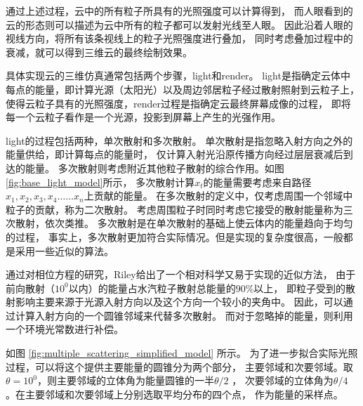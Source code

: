 通过上述过程，云中的所有粒子所具有的光照强度可以计算得到，
而人眼看到的云的形态则可以描述为云中所有的粒子都可以发射光线至人眼。
因此沿着人眼的视线方向，将所有该条视线上的粒子光照强度进行叠加，
同时考虑叠加过程中的衰减，就可以得到三维云的最终绘制效果。

具体实现云的三维仿真通常包括两个步骤，light和render。
light是指确定云体中每点的能量，即计算光源（太阳光）以及周边邻居粒子经过散射照射到云粒子上，
使得云粒子具有的光照强度，render过程是指确定云最终屏幕成像的过程，
即将每一个云粒子看作是一个光源，投影到屏幕上产生的光强作用。

light的过程包括两种，单次散射和多次散射。
单次散射是指忽略入射方向之外的能量供给，即计算每点的能量时，
仅计算入射光沿原传播方向经过层层衰减后到达的能量。
多次散射则考虑附近其他粒子散射的综合作用。如图\ref{fig:base_light_model}所示，
多次散射计算$x_t$的能量需要考虑来自路径$x_1,x_2,x_3,x_4\dots{}\dots{}x_n$上贡献的能量。
在多次散射的定义中，仅考虑周围一个邻域中粒子的贡献，称为二次散射。
考虑周围粒子时同时考虑它接受的散射能量称为三次散射，依次类推。
多次散射是在单次散射的基础上使云体内的能量趋向于均匀的过程，
事实上，多次散射更加符合实际情况。但是实现的复杂度很高，一般都是采用一些近似的算法。

通过对相位方程的研究，Riley给出了一个相对科学又易于实现的近似方法，
由于前向散射（$10^0$以内）的能量占水汽粒子散射总能量的$90\%$以上，
即粒子受到的散射影响主要来源于光源入射方向以及这个方向一个较小的夹角中。
因此，可以通过计算入射方向的一个圆锥邻域来代替多次散射。
而对于忽略掉的能量，则利用一个环境光常数进行补偿。

如图 \ref{fig:multiple_scattering_simplified_model} 所示。
为了进一步拟合实际光照过程，可以将这个提供主要能量的圆锥分为两个部分，
主要邻域和次要邻域。取$\theta{}=10^0$，则主要邻域的立体角为能量圆锥的一半$\theta{}/2$ ，
次要邻域的立体角为$\theta{}/4$ 。在主要邻域和次要邻域上分别选取平均分布的四个点，
作为能量的采样点。

